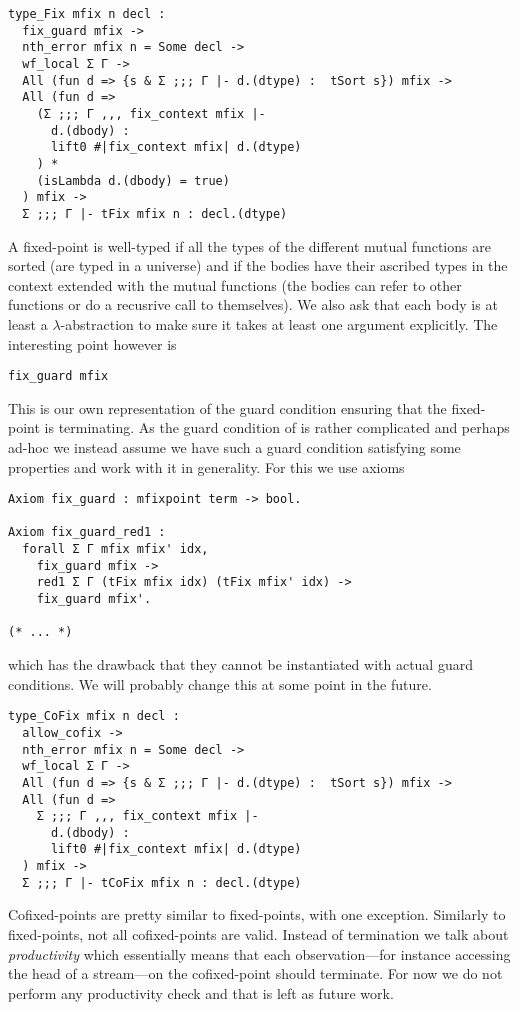 \begin{verbatim}
type_Fix mfix n decl :
  fix_guard mfix ->
  nth_error mfix n = Some decl ->
  wf_local Σ Γ ->
  All (fun d => {s & Σ ;;; Γ |- d.(dtype) :  tSort s}) mfix ->
  All (fun d =>
    (Σ ;;; Γ ,,, fix_context mfix |-
      d.(dbody) :
      lift0 #|fix_context mfix| d.(dtype)
    ) *
    (isLambda d.(dbody) = true)
  ) mfix ->
  Σ ;;; Γ |- tFix mfix n : decl.(dtype)
\end{verbatim}
A fixed-point is well-typed if all the types of the different mutual functions
are sorted (\ie are typed in a universe) and if the bodies have their ascribed
types in the context extended with the mutual functions (the bodies can refer
to other functions or do a recusrive call to themselves).
We also ask that each body is at least a \(\lambda\)-abstraction to make sure it
takes at least one argument explicitly.
The interesting point however is
\begin{verbatim}
fix_guard mfix
\end{verbatim}
This is our own representation of the guard condition ensuring that the
fixed-point is terminating. As the guard condition of \Coq is rather complicated
and perhaps ad-hoc we instead assume we have such a guard condition satisfying
some properties and work with it in generality.
For this we use axioms
\begin{verbatim}
Axiom fix_guard : mfixpoint term -> bool.

Axiom fix_guard_red1 :
  forall Σ Γ mfix mfix' idx,
    fix_guard mfix ->
    red1 Σ Γ (tFix mfix idx) (tFix mfix' idx) ->
    fix_guard mfix'.

(* ... *)
\end{verbatim}
which has the drawback that they cannot be instantiated with actual guard
conditions. We will probably change this at some point in the future.

\begin{verbatim}
type_CoFix mfix n decl :
  allow_cofix ->
  nth_error mfix n = Some decl ->
  wf_local Σ Γ ->
  All (fun d => {s & Σ ;;; Γ |- d.(dtype) :  tSort s}) mfix ->
  All (fun d =>
    Σ ;;; Γ ,,, fix_context mfix |-
      d.(dbody) :
      lift0 #|fix_context mfix| d.(dtype)
  ) mfix ->
  Σ ;;; Γ |- tCoFix mfix n : decl.(dtype)
\end{verbatim}
Cofixed-points are pretty similar to fixed-points, with one exception.
Similarly to fixed-points, not all cofixed-points are valid. Instead of
termination we talk about \emph{productivity} which essentially means that each
observation---for instance accessing the head of a stream---on the cofixed-point
should terminate.
For now we do not perform any productivity check and that is left as future
work.

